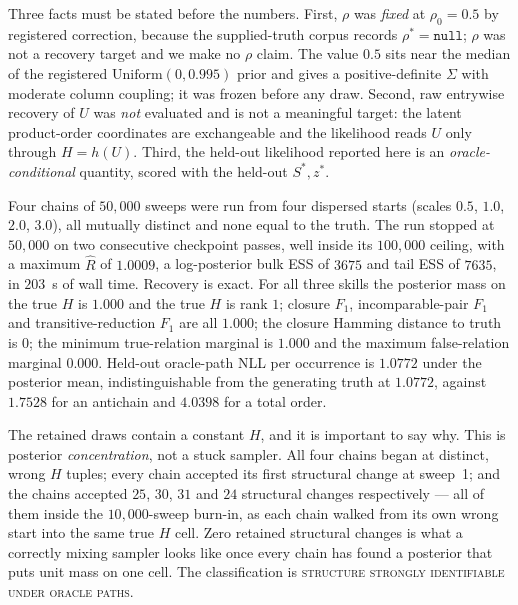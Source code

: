 Three facts must be stated before the numbers. First, $\rho$ was \emph{fixed} at
$\rho_0 = 0.5$ by registered correction, because the supplied-truth corpus
records $\rho^\ast = \texttt{null}$; $\rho$ was not a recovery target and we make
no $\rho$ claim. The value $0.5$ sits near the median of the registered
$\mathrm{Uniform}(0, 0.995)$ prior and gives a positive-definite $\Sigma$ with
moderate column coupling; it was frozen before any draw. Second, raw entrywise
recovery of $U$ was \emph{not} evaluated and is not a meaningful target: the
latent product-order coordinates are exchangeable and the likelihood reads $U$
only through $H = h(U)$. Third, the held-out likelihood reported here is an
\emph{oracle-conditional} quantity, scored with the held-out $S^\ast, z^\ast$.

Four chains of $50{,}000$ sweeps were run from four dispersed starts
(scales $0.5$, $1.0$, $2.0$, $3.0$), all mutually distinct and none equal to the
truth. The run stopped at $50{,}000$ on two consecutive checkpoint passes, well
inside its $100{,}000$ ceiling, with a maximum $\widehat{R}$ of $1.0009$, a
log-posterior bulk ESS of $3675$ and tail ESS of $7635$, in $203$~s of wall time.
Recovery is exact. For all three skills the posterior mass on the true $H$ is
$1.000$ and the true $H$ is rank $1$; closure $F_1$, incomparable-pair $F_1$ and
transitive-reduction $F_1$ are all $1.000$; the closure Hamming distance to
truth is $0$; the minimum true-relation marginal is $1.000$ and the maximum
false-relation marginal $0.000$. Held-out oracle-path NLL per occurrence is
$1.0772$ under the posterior mean, indistinguishable from the generating truth
at $1.0772$, against $1.7528$ for an antichain and $4.0398$ for a total order.

The retained draws contain a constant $H$, and it is important to say why. This
is posterior \emph{concentration}, not a stuck sampler. All four chains began at
distinct, wrong $H$ tuples; every chain accepted its first structural change at
sweep~1; and the chains accepted $25$, $30$, $31$ and $24$ structural changes
respectively --- all of them inside the $10{,}000$-sweep burn-in, as each chain
walked from its own wrong start into the same true $H$ cell. Zero retained
structural changes is what a correctly mixing sampler looks like once every
chain has found a posterior that puts unit mass on one cell. The classification
is \textsc{structure strongly identifiable under oracle paths}.

